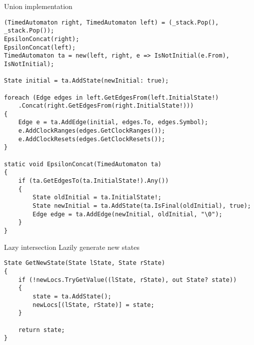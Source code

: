 \begin{frame}[fragile]{Union implementation}
    \begin{lstlisting}[style=csharp,basicstyle=\tiny]
(TimedAutomaton right, TimedAutomaton left) = (_stack.Pop(), _stack.Pop());
EpsilonConcat(right);
EpsilonConcat(left);
TimedAutomaton ta = new(left, right, e => IsNotInitial(e.From), IsNotInitial);

State initial = ta.AddState(newInitial: true);

foreach (Edge edges in left.GetEdgesFrom(left.InitialState!)
    .Concat(right.GetEdgesFrom(right.InitialState!)))
{
    Edge e = ta.AddEdge(initial, edges.To, edges.Symbol);
    e.AddClockRanges(edges.GetClockRanges());
    e.AddClockResets(edges.GetClockResets());
}

static void EpsilonConcat(TimedAutomaton ta)
{
    if (ta.GetEdgesTo(ta.InitialState!).Any())
    {
        State oldInitial = ta.InitialState!;
        State newInitial = ta.AddState(ta.IsFinal(oldInitial), true);
        Edge edge = ta.AddEdge(newInitial, oldInitial, "\0");
    }
}
    \end{lstlisting}
\end{frame}

\begin{frame}[fragile]{Lazy intersection}
    Lazily generate new states
    \begin{lstlisting}[style=csharp,basicstyle=\tiny]
State GetNewState(State lState, State rState)
{
    if (!newLocs.TryGetValue((lState, rState), out State? state))
    {
        state = ta.AddState();
        newLocs[(lState, rState)] = state;
    }

    return state;
}
    \end{lstlisting}
\end{frame}


